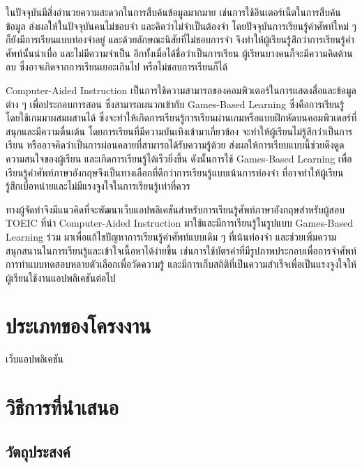 \documentclass[12pt,oneside,openright,a4paper]{cpe-thai-project}
\begin{document}
\hspace{1cm}
ในปัจจุบันมีสิ่งอำนวยความสะดวกในการสืบค้นข้อมูลมากมาย เช่นการใช้อินเตอร์เน็ตในการสืบค้นข้อมูล ส่งผลให้ในปัจจุบันคนไม่ชอบจำ
และคิดว่าไม่จำเป็นต้องจำ โดยปัจจุบันการเรียนรู้คำศัพท์ใหม่ ๆ ก็ยังมีการเรียนแบบท่องจำอยู่ และด้วยลักษณะนิสัยที่ไม่ชอบการจำ
จึงทำให้ผู้เรียนรู้สึกว่าการเรียนรู้คำศัพท์นั้นน่าเบื่อ และไม่มีความจำเป็น อีกทั้งเมื่อได้ชื่อว่าเป็นการเรียน ผู้เรียนบางคนก็จะมีความคิดด้านลบ
ซึ่งอาจเกิดจากการเรียนเยอะเกินไป หรือไม่ชอบการเรียนก็ได้

\hspace{1cm}
Computer-Aided Instruction เป็นการใช้ความสามารถของคอมพิวเตอร์ในการแสดงสื่อและข้อมูลต่าง ๆ เพื่อประกอบการสอน
ซึ่งสามารถผนวกเข้ากับ Games-Based Learning ซึ่งคือการเรียนรู้โดยใช้เกมมาผสมผสานได้
ซึ่งจะทำให้เกิดการเรียนรู้การเรียนผ่านเกมหรือแบบฝึกหัดบนคอมพิวเตอร์ที่สนุกและมีความตื่นเต้น โดยการเรียนที่มีความบันเทิงเข้ามาเกี่ยวข้อง
จะทำให้ผู้เรียนไม่รู้สึกว่าเป็นการเรียน หรืออาจคิดว่าเป็นการผ่อนคลายที่สามารถได้รับความรู้ด้วย ส่งผลให้การเรียบแบบนี้ช่วยดึงดูดความสนใจของผู้เรียน
และเกิดการเรียนรู้ได้เร็วยิ่งขึ้น ดังนั้นการใช้ Games-Based Learning เพื่อเรียนรู้คำศัพท์ภาษาอังกฤษจึงเป็นทางเลือกที่ดีกว่าการเรียนรู้แบบเน้นการท่องจำ
ที่อาจทำให้ผู้เรียนรู้สึกเบื่อหน่ายและไม่มีแรงจูงใจในการเรียนรู้เท่าที่ควร

\hspace{1cm}
ทางผู้จัดทำจึงมีแนวคิดที่จะพัฒนาเว็บแอปพลิเคชันสำหรับการเรียนรู้ศัพท์ภาษาอังกฤษสำหรับผู้สอบ TOEIC ที่นำ Computer-Aided Instruction
มาใช้และมีการเรียนรู้ในรูปแบบ Games-Based Learning ร่วม มาเพื่อแก้ไขปัญหาการเรียนรู้คำศัพท์แบบเดิม ๆ ที่เน้นท่องจำ
และช่วยเพิ่มความสนุกสนานในการเรียนรู้และเข้าใจเนื้อหาได้ง่ายขึ้น เช่นการใช้บัตรคำที่มีรูปภาพประกอบเพื่อการจำศัพท์
การทำแบบทดสอบหลายตัวเลือกเพื่อวัดความรู้ และมีการเก็บสถิติที่เป็นความสำเร็จเพื่อเป็นแรงจูงใจให้ผู้เรียนใช้งานแอปพลิเคชันต่อไป

\section{ประเภทของโครงงาน }

\hspace{1cm}เว็บแอปพลิเคชัน

\section{วิธีการที่นำเสนอ}

\subsection{วัตถุประสงค์}
\end{document}
